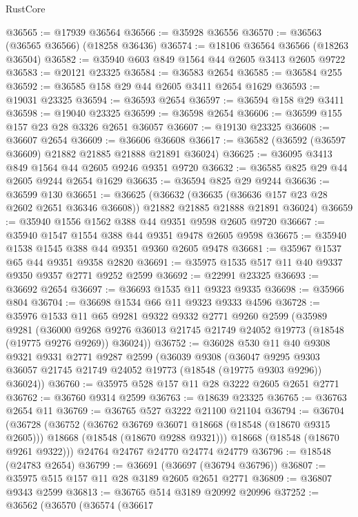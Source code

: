 \begin{lexlean}{RustCore}
\begin{coremodule}
@36565 := @17939 @36564
@36566 := @35928 @36556
@36570 := @36563 (@36565 @36566) (@18258 @36436)
@36574 := @18106 @36564 @36566 (@18263 @36504)
@36582 := @35940 @603 @849 @1564 @44 @2605 @3413 @2605 @9722
@36583 := @20121 @23325
@36584 := @36583 @2654
@36585 := @36584 @255
@36592 := @36585 @158 @29 @44 @2605 @3411 @2654 @1629
@36593 := @19031 @23325
@36594 := @36593 @2654
@36597 := @36594 @158 @29 @3411
@36598 := @19040 @23325
@36599 := @36598 @2654
@36606 := @36599 @155 @157 @23 @28 @3326 @2651 @36057
@36607 := @19130 @23325
@36608 := @36607 @2654
@36609 := @36606 @36608
@36617 := @36582 (@36592 (@36597 @36609) @21882 @21885 @21888 @21891 @36024)
@36625 := @36095 @3413 @849 @1564 @44 @2605 @9246 @9351 @9720
@36632 := @36585 @825 @29 @44 @2605 @9244 @2654 @1629
@36635 := @36594 @825 @29 @9244
@36636 := @36599 @130
@36651 := @36625
    (@36632
      (@36635 (@36636 @157 @23 @28 @2602 @2651 @36346 @36608))
      @21882
      @21885
      @21888
      @21891
      @36024)
@36659 := @35940 @1556 @1562 @388 @44 @9351 @9598 @2605 @9720
@36667 := @35940 @1547 @1554 @388 @44 @9351 @9478 @2605 @9598
@36675 := @35940 @1538 @1545 @388 @44 @9351 @9360 @2605 @9478
@36681 := @35967 @1537 @65 @44 @9351 @9358 @2820
@36691 := @35975 @1535 @517 @11 @40 @9337 @9350 @9357 @2771 @9252 @2599
@36692 := @22991 @23325
@36693 := @36692 @2654
@36697 := @36693 @1535 @11 @9323 @9335
@36698 := @35966 @804
@36704 := @36698 @1534 @66 @11 @9323 @9333 @4596
@36728 := @35976
    @1533
    @11
    @65
    @9281
    @9322
    @9332
    @2771
    @9260
    @2599
    (@35989
      @9281
      (@36000 @9268 @9276 @36013 @21745 @21749 @24052 @19773 (@18548 (@19775 @9276 @9269)) @36024))
@36752 := @36028
    @530
    @11
    @40
    @9308
    @9321
    @9331
    @2771
    @9287
    @2599
    (@36039
      @9308
      (@36047 @9295 @9303 @36057 @21745 @21749 @24052 @19773 (@18548 (@19775 @9303 @9296)) @36024))
@36760 := @35975 @528 @157 @11 @28 @3222 @2605 @2651 @2771
@36762 := @36760 @9314 @2599
@36763 := @18639 @23325
@36765 := @36763 @2654 @11
@36769 := @36765 @527 @3222 @21100 @21104
@36794 := @36704
    (@36728
      (@36752
        (@36762 @36769 @36071 @18668 (@18548 (@18670 @9315 @2605)))
        @18668
        (@18548 (@18670 @9288 @9321)))
      @18668
      (@18548 (@18670 @9261 @9322)))
    @24764
    @24767
    @24770
    @24774
    @24779
@36796 := @18548 (@24783 @2654)
@36799 := @36691 (@36697 (@36794 @36796))
@36807 := @35975 @515 @157 @11 @28 @3189 @2605 @2651 @2771
@36809 := @36807 @9343 @2599
@36813 := @36765 @514 @3189 @20992 @20996
@37252 := @36562
    (@36570
      (@36574
        (@36617

\end{coremodule}
\end{lexlean}
